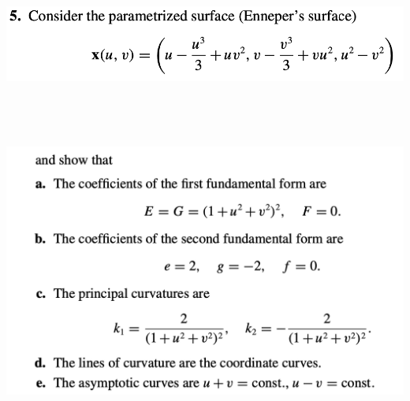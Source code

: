 \documentclass{report}
\begin{document}
\begin{question}{}{}
\includegraphics[height=3cm,width=18cm]{hw5q8}
\includegraphics[height=12cm,width=18cm]{hw5q8a}
\end{question}
\end{document}
